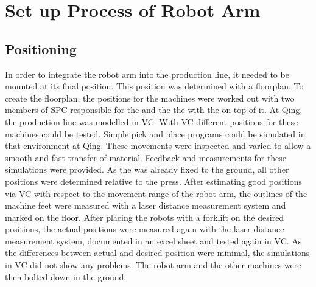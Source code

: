 \section{Set up Process of Robot Arm}

\subsection{Positioning}
In order to integrate the robot arm into the production line, it needed to be mounted at its final position. This position was determined with a floorplan. To create the floorplan, the positions for the machines were worked out with two members of \ac{SPC} responsible for the  and the the  with the  on top of it.
At Qing, the production line was modelled in \ac{VC}. With \ac{VC} different positions for these machines could be tested. 
Simple pick and place programs could be simulated in that environment at Qing.
These movements were inspected and varied to allow a smooth and fast transfer of material. Feedback and measurements for these simulations were provided.
As the  was already fixed to the ground, all other positions were determined relative to the press.
After estimating good positions via \ac{VC} with respect to the movement range of the robot arm, the outlines of the machine feet were measured with a laser distance measurement system and marked on the floor.
After placing the robots with a forklift %
on the desired positions, the actual positions were measured again with the laser distance measurement system, documented in an excel sheet and tested again in VC. 
As the differences between actual and desired position were minimal, the simulations in VC did not show any problems.
The robot arm and the other machines were then bolted down in the ground. \\



